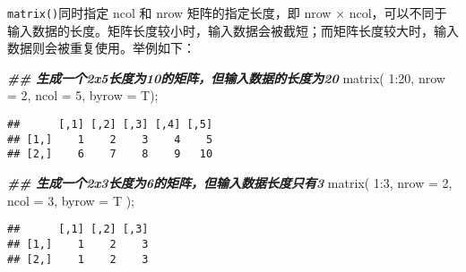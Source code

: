 \documentclass[ignorenonframetext,]{beamer}
\newenvironment{Shaded}{\begin{snugshade}}{\end{snugshade}}
\newcommand{\AttributeTok}[1]{\textcolor[rgb]{0.77,0.63,0.00}{#1}}
\newcommand{\DecValTok}[1]{\textcolor[rgb]{0.00,0.00,0.81}{#1}}
\newcommand{\DocumentationTok}[1]{\textcolor[rgb]{0.56,0.35,0.01}{\textbf{\textit{#1}}}}
\newcommand{\FunctionTok}[1]{\textcolor[rgb]{0.00,0.00,0.00}{#1}}
\newcommand{\NormalTok}[1]{#1}
\newcommand{\SpecialCharTok}[1]{\textcolor[rgb]{0.00,0.00,0.00}{#1}}
\newcommand\FontSmall{\fontsize{7}{8}\selectfont}
\begin{document}
\begin{frame}[fragile]{\texttt{matrix()}同时指定 ncol 和 nrow}
\protect\hypertarget{matrixux540cux65f6ux6307ux5b9a-ncol-ux548c-nrow}{}
矩阵的指定长度，即 nrow ×
ncol，可以不同于输入数据的长度。矩阵长度较小时，输入数据会被截短；而矩阵长度较大时，输入数据则会被重复使用。举例如下：

\FontSmall

\begin{Shaded}
\begin{Highlighting}[]
\DocumentationTok{\#\# 生成一个2x5长度为10的矩阵，但输入数据的长度为20}
\FunctionTok{matrix}\NormalTok{( }\DecValTok{1}\SpecialCharTok{:}\DecValTok{20}\NormalTok{, }\AttributeTok{nrow =} \DecValTok{2}\NormalTok{, }\AttributeTok{ncol =} \DecValTok{5}\NormalTok{, }\AttributeTok{byrow =}\NormalTok{ T); }
\end{Highlighting}
\end{Shaded}

\begin{verbatim}
##      [,1] [,2] [,3] [,4] [,5]
## [1,]    1    2    3    4    5
## [2,]    6    7    8    9   10
\end{verbatim}

\begin{Shaded}
\begin{Highlighting}[]
\DocumentationTok{\#\# 生成一个2x3长度为6的矩阵，但输入数据长度只有3}
\FunctionTok{matrix}\NormalTok{( }\DecValTok{1}\SpecialCharTok{:}\DecValTok{3}\NormalTok{, }\AttributeTok{nrow =} \DecValTok{2}\NormalTok{, }\AttributeTok{ncol =} \DecValTok{3}\NormalTok{, }\AttributeTok{byrow =}\NormalTok{ T ); }
\end{Highlighting}
\end{Shaded}

\begin{verbatim}
##      [,1] [,2] [,3]
## [1,]    1    2    3
## [2,]    1    2    3
\end{verbatim}
\end{frame}
\end{document}
